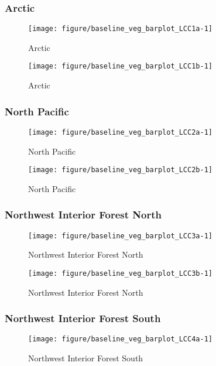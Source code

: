 \documentclass{article}\usepackage[]{graphicx}\usepackage[]{color}
\makeatletter
\def\maxwidth{ %
  \ifdim\Gin@nat@width>\linewidth
    \linewidth
  \else
    \Gin@nat@width
  \fi
}
\makeatother
\begin{document}
\subsubsection{Arctic}
\begin{figure}[H]
\texttt{[image: figure/baseline\_veg\_barplot\_LCC1a-1]} \caption[Arctic]{Arctic}\label{fig:baseline_veg_barplot_LCC1a}
\end{figure}


\begin{figure}[H]
\texttt{[image: figure/baseline\_veg\_barplot\_LCC1b-1]} \caption[Arctic]{Arctic}\label{fig:baseline_veg_barplot_LCC1b}
\end{figure}



\subsubsection{North Pacific}
\begin{figure}[H]
\texttt{[image: figure/baseline\_veg\_barplot\_LCC2a-1]} \caption[North Pacific]{North Pacific}\label{fig:baseline_veg_barplot_LCC2a}
\end{figure}


\begin{figure}[H]
\texttt{[image: figure/baseline\_veg\_barplot\_LCC2b-1]} \caption[North Pacific]{North Pacific}\label{fig:baseline_veg_barplot_LCC2b}
\end{figure}



\subsubsection{Northwest Interior Forest North}
\begin{figure}[H]
\texttt{[image: figure/baseline\_veg\_barplot\_LCC3a-1]} \caption[Northwest Interior Forest North]{Northwest Interior Forest North}\label{fig:baseline_veg_barplot_LCC3a}
\end{figure}


\begin{figure}[H]
\texttt{[image: figure/baseline\_veg\_barplot\_LCC3b-1]} \caption[Northwest Interior Forest North]{Northwest Interior Forest North}\label{fig:baseline_veg_barplot_LCC3b}
\end{figure}



\subsubsection{Northwest Interior Forest South}
\begin{figure}[H]
\texttt{[image: figure/baseline\_veg\_barplot\_LCC4a-1]} \caption[Northwest Interior Forest South]{Northwest Interior Forest South}\label{fig:baseline_veg_barplot_LCC4a}
\end{figure}
\end{document}
